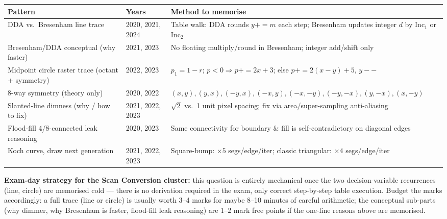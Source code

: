 \documentclass[12pt, a4paper]{article}
\newenvironment{notesbox}{\begin{mdframed}[style=notesframe]}{\end{mdframed}}
\begin{document}
\begin{center}
\renewcommand{\arraystretch}{1.3}
\begin{tabular}{p{5cm}|p{2.7cm}|p{6.3cm}}
\toprule
\textbf{Pattern} & \textbf{Years} & \textbf{Method to memorise} \\
\midrule
DDA vs.\ Bresenham line trace & 2020, 2021, 2024 & Table walk: DDA rounds $y{+}{=}m$ each step; Bresenham updates integer $d$ by $\mathrm{Inc}_1$ or $\mathrm{Inc}_2$ \\
Bresenham/DDA conceptual (why faster) & 2021, 2023 & No floating multiply/round in Bresenham; integer add/shift only \\
Midpoint circle raster trace (octant + symmetry) & 2022, 2023 & $p_1=1{-}r$; $p<0\Rightarrow p{+}{=}2x{+}3$; else $p{+}{=}2(x{-}y){+}5,\,y{-}{-}$ \\
8-way symmetry (theory only) & 2020, 2022 & {\scriptsize $(x,y),(y,x),(-y,x),(-x,y),(-x,-y),(-y,-x),(y,-x),(x,-y)$} \\
Slanted-line dimness (why / how to fix) & 2021, 2022, 2023 & $\sqrt2$ vs.\ 1 unit pixel spacing; fix via area/super-sampling anti-aliasing \\
Flood-fill 4/8-connected leak reasoning & 2020, 2023 & Same connectivity for boundary \& fill is self-contradictory on diagonal edges \\
Koch curve, draw next generation & 2021, 2022, 2023 & Square-bump: $\times5$ segs/edge/iter; classic triangular: $\times4$ segs/edge/iter \\
\bottomrule
\end{tabular}
\end{center}

\begin{notesbox}
\textbf{Exam-day strategy for the Scan Conversion cluster:} this question is entirely mechanical once the two decision-variable recurrences (line, circle) are memorised cold --- there is no derivation required in the exam, only correct step-by-step table execution. Budget the marks accordingly: a full trace (line or circle) is usually worth 3--4 marks for maybe 8--10 minutes of careful arithmetic; the conceptual sub-parts (why dimmer, why Bresenham is faster, flood-fill leak reasoning) are 1--2 mark free points if the one-line reasons above are memorised.
\end{notesbox}
\end{document}
